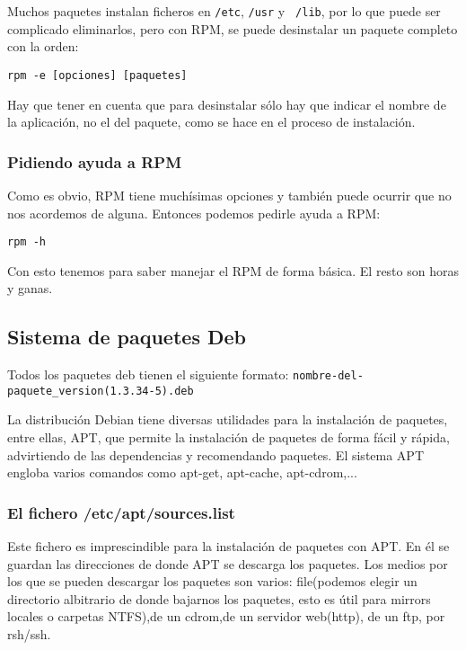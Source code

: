 Muchos paquetes  instalan ficheros  en {\tt /etc},  {\tt /usr}  y {\tt
/lib}, por lo  que puede ser complicado eliminarlos, pero  con RPM, se
puede desinstalar un paquete completo con la orden:

\begin{verbatim}
rpm -e [opciones] [paquetes]
\end{verbatim}

Hay que tener  en cuenta que para desinstalar sólo  hay que indicar el
nombre de la aplicación, no el del paquete, como se hace en el proceso
de instalación.

\subsubsection{Pidiendo ayuda a  RPM}

Como es obvio,  RPM tiene muchísimas opciones y  también puede ocurrir
que no nos acordemos de alguna. Entonces podemos pedirle ayuda a RPM:

\begin{verbatim}
rpm -h
\end{verbatim}

Con esto tenemos  para saber manejar el RPM de  forma básica. El resto
son horas y ganas.


\subsection{Sistema de paquetes Deb}
Todos los paquetes deb tienen el siguiente formato:
{\tt nombre-del-paquete\_version(1.3.34-5).deb}  

La distribución  Debian tiene diversas utilidades  para la instalación
de  paquetes,  entre  ellas,  APT,   que  permite  la  instalación  de
paquetes de  forma fácil y  rápida, advirtiendo de las  dependencias y
recomendando  paquetes. El  sistema APT  engloba varios  comandos como
apt-get, apt-cache, apt-cdrom,...

\subsubsection{El fichero /etc/apt/sources.list}
Este fichero  es imprescindible  para la  instalación de  paquetes con
APT. En  él se guardan  las direcciones de  donde APT se  descarga los
paquetes. Los medios por los que  se pueden descargar los paquetes son
varios: file(podemos elegir un directorio albitrario de donde bajarnos
los paquetes, esto es útil para mirrors locales o carpetas NTFS),de un
cdrom,de un servidor web(http), de un ftp, por rsh/ssh.


